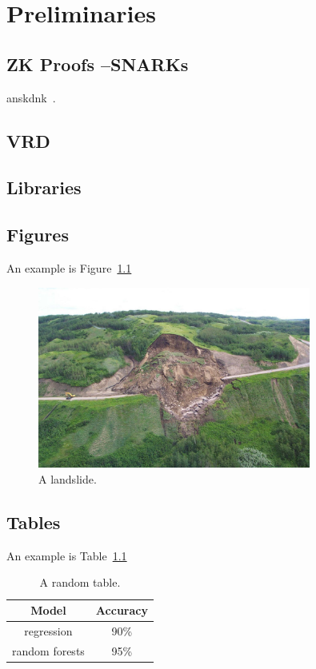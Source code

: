 \chapter{Preliminaries}

\section{ZK Proofs --SNARKs}

anskdnk~\cite{CANS:BagPinRaf20}. 


\section{VRD}


\section{Libraries}



\section{Figures}
An example is Figure~\ref{Landslide}
\begin{figure}[h] %
    \centering %
    \includegraphics[width=0.8\textwidth]{Figures/landslide3.jpg}
    \caption{A landslide.}
    \label{Landslide}
\end{figure}

\newpage

\section{Tables}
An example is Table~\ref{Tabel1}
\begin{table}[h]
    \centering
    \begin{tabular}{|c|c|}
        \hline
       \bf Model  & \bf Accuracy  \\ \hline
        regression & 90\%                \\ \hline
        random forests & 95\%           \\ \hline
    \end{tabular}
    \caption{A random table.}
    \label{Tabel1}
\end{table}

